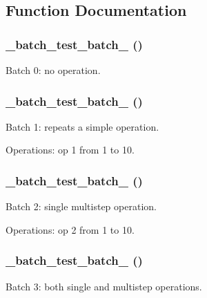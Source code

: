 \subsection{Function Documentation}
\hypertarget{batch__test_8module_abe78c3c0260e06a43e2f18a3a548aae4}{
\subsubsection[{\_\-batch\_\-test\_\-batch\_\-0}]{\setlength{\rightskip}{0pt plus 5cm}\_\-batch\_\-test\_\-batch\_ ()}}
\label{batch__test_8module_abe78c3c0260e06a43e2f18a3a548aae4}
Batch 0: no operation. \hypertarget{batch__test_8module_a4d6633034b1ecabf144319b0914497bb}{
\subsubsection[{\_\-batch\_\-test\_\-batch\_\-1}]{\setlength{\rightskip}{0pt plus 5cm}\_\-batch\_\-test\_\-batch\_ ()}}
\label{batch__test_8module_a4d6633034b1ecabf144319b0914497bb}
Batch 1: repeats a simple operation.

Operations: op 1 from 1 to 10. \hypertarget{batch__test_8module_a0830c7033c5e5527e28dee83f9a677c0}{
\subsubsection[{\_\-batch\_\-test\_\-batch\_\-2}]{\setlength{\rightskip}{0pt plus 5cm}\_\-batch\_\-test\_\-batch\_ ()}}
\label{batch__test_8module_a0830c7033c5e5527e28dee83f9a677c0}
Batch 2: single multistep operation.

Operations: op 2 from 1 to 10. \hypertarget{batch__test_8module_a09e8fda0115a2f4b613bce7ff626336a}{
\subsubsection[{\_\-batch\_\-test\_\-batch\_\-3}]{\setlength{\rightskip}{0pt plus 5cm}\_\-batch\_\-test\_\-batch\_ ()}}
\label{batch__test_8module_a09e8fda0115a2f4b613bce7ff626336a}
Batch 3: both single and multistep operations.

